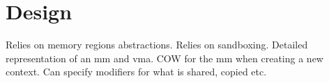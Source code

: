 \chapter{Design}
Relies on memory regions abstractions.
Relies on sandboxing.
Detailed representation of an mm and vma.
COW for the mm when creating a new context.
Can specify modifiers for what is shared, copied etc.


